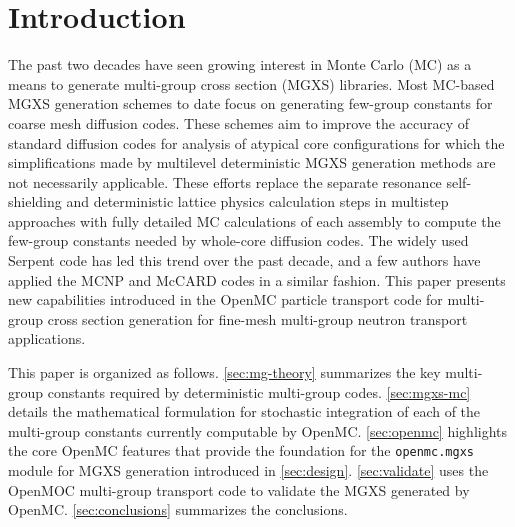 \section{Introduction}
\label{sec:intro}

The past two decades have seen growing interest in Monte Carlo (MC) as a means to generate multi-group cross section (MGXS) libraries. Most MC-based MGXS generation schemes to date focus on generating few-group constants for coarse mesh diffusion codes. These schemes aim to improve the accuracy of standard diffusion codes for analysis of atypical core configurations for which the simplifications made by multilevel deterministic MGXS generation methods are not necessarily applicable. These efforts replace the separate resonance self-shielding and deterministic lattice physics calculation steps in multistep approaches with fully detailed MC calculations of each assembly to compute the few-group constants needed by whole-core diffusion codes. The widely used Serpent code\cite{leppanen2015serpent} has led this trend over the past decade, and a few authors have applied the MCNP\cite{pounders2006stochastically} and McCARD\cite{shim2008generation} codes in a similar fashion. This paper presents new capabilities introduced in the OpenMC\cite{romano2015openmc} particle transport code for multi-group cross section generation for fine-mesh multi-group neutron transport applications.

This paper is organized as follows. \cref{sec:mg-theory} summarizes the key multi-group constants required by deterministic multi-group codes. \cref{sec:mgxs-mc} details the mathematical formulation for stochastic integration of each of the multi-group constants currently computable by OpenMC. \cref{sec:openmc} highlights the core OpenMC features that provide the foundation for the \texttt{openmc.mgxs} module for MGXS generation introduced in \cref{sec:design}. \cref{sec:validate} uses the OpenMOC\cite{boyd2014openmoc} multi-group transport code to validate the MGXS generated by OpenMC. \cref{sec:conclusions} summarizes the conclusions.

